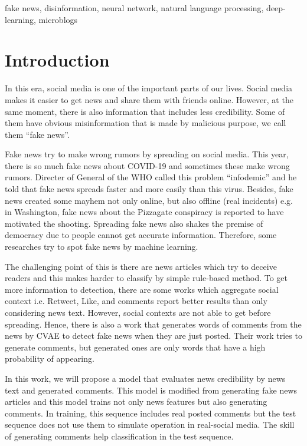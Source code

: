 \documentclass[conference]{IEEEtran}
\begin{document}
\begin{IEEEkeywords}
fake news, disinformation, neural network, natural language processing, deep-learning, microblogs
\end{IEEEkeywords}

\section{Introduction}
In this era, social media is one of the important parts of our lives.
Social media makes it easier to get news and share them with friends online.
However, at the same moment, 
there is also information that includes less credibility.
Some of them have obvious misinformation that is made by malicious purpose,
we call them ``fake news''.

Fake news try to make wrong rumors by spreading on social media.
This year, there is so much fake news about COVID-19 and sometimes these make wrong rumors.
Directer of General of the WHO called this problem ``infodemic'' and he told that fake news spreads faster and more easily than this virus\cite{ZAROCOSTAS2020676}. 
Besides, fake news created some mayhem not only online, but also offline (real incidents)
e.g. in Washington, fake news about the Pizzagate conspiracy is reported to have motivated the shooting\cite{agencies_2016}.
Spreading fake news also shakes the premise of democracy due to people cannot get accurate information.
Therefore, some researches try to spot fake news by machine learning.

The challenging point of this is there are news articles which try to deceive readers
and this makes harder to classify by simple rule-based method.
To get more information to detection,
there are some works which aggregate social context i.e. Retweet, Like, and comments
report better results than only considering news text\cite{Guo:2018:RDH:3269206.3271709}.
However, social contexts are not able to get before spreading.
Hence, there is also a work that generates words of comments from the news by CVAE to detect fake news when they are just posted\cite{ijcai2018-533}.
Their work tries to generate comments, but generated ones are only words that have a high probability of appearing.

In this work, we will propose a model that evaluates news credibility by news text and generated comments.
This model is modified from generating fake news articles\cite{NIPS2019_9106} and this model trains not only news features but also generating comments.
In training, this sequence includes real posted comments but the test sequence does not use them to simulate operation in real-social media.
The skill of generating comments help classification in the test sequence.
\end{document}
